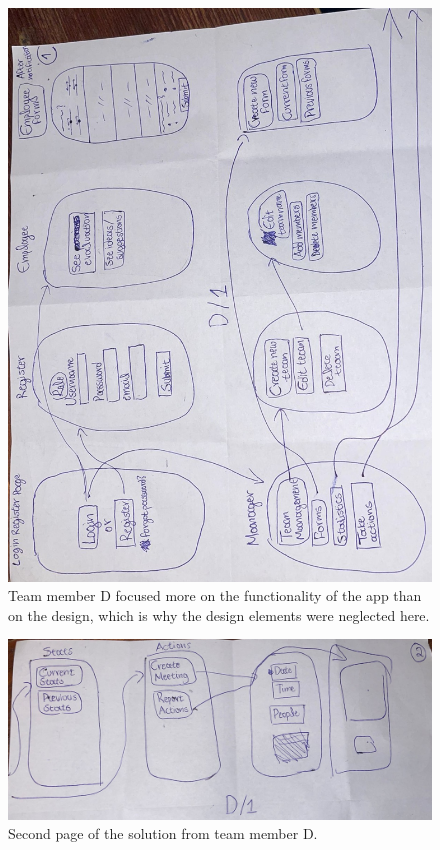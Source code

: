 \documentclass[11pt]{article}
\begin{document}
\begin{figure}[!h]
    \centering
    \includegraphics[width = \textwidth]{figures/D1.jpg}
    \caption{Team member D focused more on the functionality of the app than on the design, which is why the design elements were neglected here.}
\end{figure}

\begin{figure}[!h]
    \centering
    \includegraphics[width = \textwidth]{figures/D1.1.jpg}
    \caption{Second page of the solution from team member D.}
\end{figure}
\end{document}

